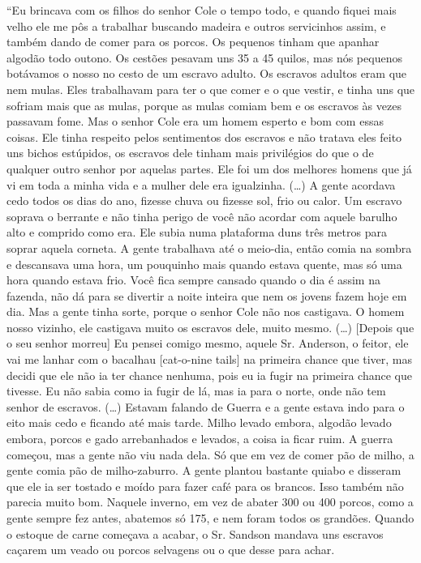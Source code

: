 ``Eu brincava com os filhos do senhor Cole o tempo todo, e quando fiquei
mais velho ele me pôs a trabalhar buscando madeira e outros servicinhos
assim, e também dando de comer para os porcos. Os pequenos tinham que
apanhar algodão todo outono. Os cestões pesavam uns 35 a 45 quilos, mas
nós pequenos botávamos o nosso no cesto de um escravo adulto. Os
escravos adultos eram que nem mulas. Eles trabalhavam para ter o que
comer e o que vestir, e tinha uns que sofriam mais que as mulas, porque
as mulas comiam bem e os escravos às vezes passavam fome. Mas o senhor
Cole era um homem esperto e bom com essas coisas. Ele tinha respeito
pelos sentimentos dos escravos e não tratava eles feito uns bichos
estúpidos, os escravos dele tinham mais privilégios do que o de qualquer
outro senhor por aquelas partes. Ele foi um dos melhores homens que já
vi em toda a minha vida e a mulher dele era igualzinha. (\ldots{}) A
gente acordava cedo todos os dias do ano, fizesse chuva ou fizesse sol,
frio ou calor. Um escravo soprava o berrante e não tinha perigo de você
não acordar com aquele barulho alto e comprido como era. Ele subia numa
plataforma duns três metros para soprar aquela corneta. A gente
trabalhava até o meio-dia, então comia na sombra e descansava uma hora,
um pouquinho mais quando estava quente, mas só uma hora quando estava
frio. Você fica sempre cansado quando o dia é assim na fazenda, não dá
para se divertir a noite inteira que nem os jovens fazem hoje em dia.
Mas a gente tinha sorte, porque o senhor Cole não nos castigava. O homem
nosso vizinho, ele castigava muito os escravos dele, muito mesmo.
(\ldots{}) {[}Depois que o seu senhor morreu{]} Eu pensei comigo mesmo,
aquele Sr. Anderson, o feitor, ele vai me lanhar com o bacalhau
{[}cat-o-nine tails{]} na primeira chance que tiver, mas decidi que ele
não ia ter chance nenhuma, pois eu ia fugir na primeira chance que
tivesse. Eu não sabia como ia fugir de lá, mas ia para o norte, onde não
tem senhor de escravos. (\ldots{}) Estavam falando de Guerra e a gente
estava indo para o eito mais cedo e ficando até mais tarde. Milho levado
embora, algodão levado embora, porcos e gado arrebanhados e levados, a
coisa ia ficar ruim. A guerra começou, mas a gente não viu nada dela. Só
que em vez de comer pão de milho, a gente comia pão de milho-zaburro. A
gente plantou bastante quiabo e disseram que ele ia ser tostado e moído
para fazer café para os brancos. Isso também não parecia muito bom.
Naquele inverno, em vez de abater 300 ou 400 porcos, como a gente sempre
fez antes, abatemos só 175, e nem foram todos os grandões. Quando o
estoque de carne começava a acabar, o Sr. Sandson mandava uns escravos
caçarem um veado ou porcos selvagens ou o que desse para achar.

